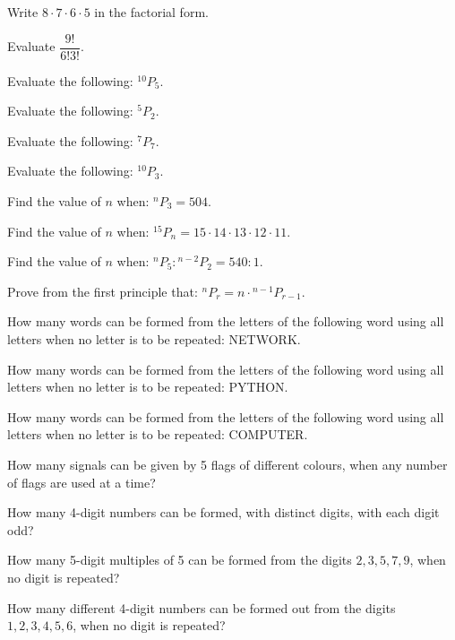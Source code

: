 \documentclass[11pt,a4paper]{article}
\begin{document}
\begin{shortlist}
\item Write $8\cdot 7\cdot 6\cdot 5$ in the factorial form.

\item Evaluate $\dfrac{9!}{6!3!}$.

\item Evaluate the following: ${}^{10}P_5$.

\item Evaluate the following: ${}^5P_2$.

\item Evaluate the following: ${}^7P_7$.

\item Evaluate the following: ${}^{10}P_3$.

\item Find the value of $n$ when: ${}^nP_3=504$.

\item Find the value of $n$ when: ${}^{15}P_n=15\cdot 14\cdot 13\cdot 12\cdot 11$.

\item Find the value of $n$ when: ${}^nP_5:{}^{n-2}P_2=540:1$.

\item Prove from the first principle that: ${}^nP_r=n\cdot{}^{n-1}P_{r-1}$.

\item How many words can be formed from the letters of the following word using all letters when no letter is to be repeated: NETWORK.

\item How many words can be formed from the letters of the following word using all letters when no letter is to be repeated: PYTHON.

\item How many words can be formed from the letters of the following word using all letters when no letter is to be repeated: COMPUTER.

\item How many signals can be given by 5 flags of different colours, when any number of flags are used at a time?

\item How many 4-digit numbers can be formed, with distinct digits, with each digit odd?

\item How many 5-digit multiples of 5 can be formed from the digits $2,3,5,7,9$, when no digit is repeated?

\item How many different 4-digit numbers can be formed out from the digits $1,2,3,4,5,6$, when no digit is repeated?


\end{shortlist}
\end{document}
